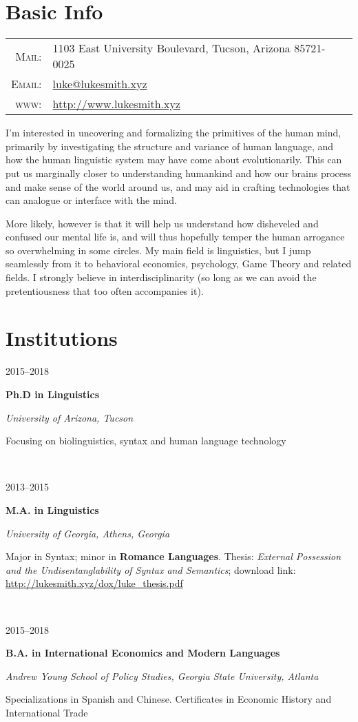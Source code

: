 \documentclass[letterpaper,10pt]{article}
\newcommand{\entry}[4]{

\begin{minipage}[t]{.15\textwidth}
\hfill \textsc{#1}
\end{minipage}
\hfill\vline\hfill
\begin{minipage}[t]{.80\textwidth}
#2

\textit{#3}

\footnotesize{#4}
\end{minipage}\\\vspace{.25cm}}
\newcommand{\uga}{University of Georgia}
\newcommand{\gsu}{Georgia State University}
\newcommand{\ua}{University of Arizona}
\begin{document}

\par{\par}

\section{Basic Info}

\begin{tabular}{rl}
    \textsc{Mail:}   & 1103 East University Boulevard, Tucson, Arizona 85721-0025 \\
    \textsc{Email:}     & \href{mailto:luke@lukesmith.xyz}{luke@lukesmith.xyz}\\
    \textsc{www:}&\href{http://www.lukesmith.xyz}{http://www.lukesmith.xyz}
\end{tabular}

\vspace{.25cm}

\noindent I'm interested in uncovering and formalizing the primitives of the human mind, primarily by investigating the structure and variance of human language, and how the human linguistic system may have come about evolutionarily. This can put us marginally closer to understanding humankind and how our brains process and make sense of the world around us, and may aid in crafting technologies that can analogue or interface with the mind.

\vspace{.25cm}

\noindent More likely, however is that it will help us understand how disheveled and confused our mental life is, and will thus hopefully temper the human arrogance so overwhelming in some circles. My main field is linguistics, but I jump seamlessly from it to behavioral economics, psychology, Game Theory and related fields. I strongly believe in interdisciplinarity (so long as we can avoid the pretentiousness that too often accompanies it).

\section{Institutions}

\entry{2015--2018}{\textbf{Ph.D in Linguistics}}{\ua, Tucson}{Focusing on biolinguistics, syntax and human language technology}
\entry{2013--2015}{\textbf{M.A. in Linguistics}}{\uga, Athens, Georgia}{Major in Syntax; minor in \textbf{Romance Languages}. Thesis: \textit{External Possession and the Undisentanglability of Syntax and Semantics}; download link: \href{http://lukesmith.xyz/dox/luke\_thesis.pdf}{http://lukesmith.xyz/dox/luke\_thesis.pdf}}
\entry{2015--2018}{\textbf{B.A. in International Economics and Modern Languages}}{Andrew Young School of Policy Studies, \gsu, Atlanta}{Specializations in Spanish and Chinese. Certificates in Economic History and International Trade}
\end{document}
